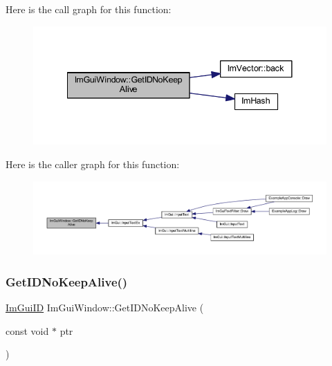 Here is the call graph for this function\+:
\nopagebreak
\begin{figure}[H]
\begin{center}
\leavevmode
\includegraphics[width=341pt]{struct_im_gui_window_adc0a43f74a0b53a15a4bc4fea05524fe_cgraph}
\end{center}
\end{figure}
Here is the caller graph for this function\+:
\nopagebreak
\begin{figure}[H]
\begin{center}
\leavevmode
\includegraphics[width=350pt]{struct_im_gui_window_adc0a43f74a0b53a15a4bc4fea05524fe_icgraph}
\end{center}
\end{figure}
\mbox{\label{struct_im_gui_window_aea0ace882f6e8ec9d6825d808c975203}} 
\subsubsection{\texorpdfstring{Get\+I\+D\+No\+Keep\+Alive()}{GetIDNoKeepAlive()}\hspace{0.1cm}{\footnotesize\ttfamily [2/2]}}
{\footnotesize\ttfamily \mbox{\hyperlink{imgui_8h_a1785c9b6f4e16406764a85f32582236f}{Im\+Gui\+ID}} Im\+Gui\+Window\+::\+Get\+I\+D\+No\+Keep\+Alive (\begin{DoxyParamCaption}\item[{const void $\ast$}]{ptr }\end{DoxyParamCaption})}

